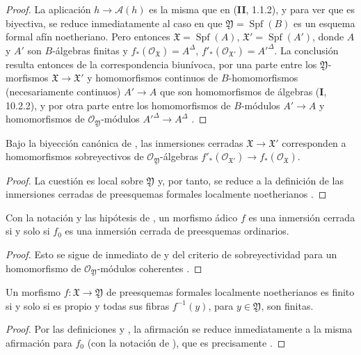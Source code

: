 \begin{proof}
La aplicación $h\to\mathcal A(h)$ es la misma que en (\textbf{II}, 1.1.2), y para ver que es biyectiva, se reduce inmediatamente al caso en que $\mathfrak Y=\operatorname{Spf}(B)$ es un esquema formal afín noetheriano.
Pero entonces $\mathfrak X=\operatorname{Spf}(A)$,
$\mathfrak X'=\operatorname{Spf}(A')$, donde $A$ y $A'$ son $B$-álgebras
finitas y $f_*(\mathcal O_{\mathfrak X})=A^\Delta$,
$f'_*(\mathcal O_{\mathfrak X'})=A'^\Delta$. La conclusión resulta entonces de
la correspondencia biunívoca, por una parte entre los $\mathfrak Y$-morfismos
$\mathfrak X\to\mathfrak X'$ y homomorfismos continuos de
$B$-homomorfismos (necesariamente continuos) $A'\to A$ que son homomorfismos de álgebras (\textbf{I}, 10.2.2), y por otra parte entre los homomorfismos de $B$-módulos
$A'\to A$ y homomorfismos de
$\mathcal O_{\mathfrak Y}$-módulos
$A'^\Delta\to A^\Delta$ .
\end{proof}

\begin{corollary}[4.8.9]
\label{III.4.8.9}
\label{III.4.8.9-fr}
Bajo la biyección canónica de , las inmersiones
cerradas $\mathfrak X\to\mathfrak X'$ corresponden a
homomorfismos sobreyectivos de $\mathcal O_{\mathfrak Y}$-álgebras
$f'_*(\mathcal O_{\mathfrak X'})\to f_*(\mathcal O_{\mathfrak X})$.
\end{corollary}

\begin{proof}
La cuestión es local sobre $\mathfrak Y$ y, por tanto, se reduce a la
definición de las inmersiones cerradas de preesquemas formales localmente
noetherianos .
\end{proof}

\begin{corollary}[4.8.10]
\label{III.4.8.10}
\label{III.4.8.10-fr}
Con la notación y las hipótesis de , un morfismo
ádico $f$ es una inmersión cerrada si y solo si $f_0$ es una
inmersión cerrada de preesquemas ordinarios.
\end{corollary}

\begin{proof}
Esto se sigue de inmediato de  y del criterio de
sobreyectividad para un homomorfismo de
$\mathcal O_{\mathfrak Y}$-módulos coherentes .
\end{proof}

\begin{proposition}[4.8.11]
\label{III.4.8.11}
\label{III.4.8.11-fr}
Un morfismo $f:\mathfrak X\to\mathfrak Y$ de preesquemas formales
localmente noetherianos
es finito si y solo si es propio y todas sus fibras
$f^{-1}(y)$, para $y\in\mathfrak Y$, son finitas.
\end{proposition}

\begin{proof}
Por las definiciones  y , la
afirmación se reduce inmediatamente a la misma afirmación para $f_0$
(con la notación de ), que es precisamente
.
\end{proof}
